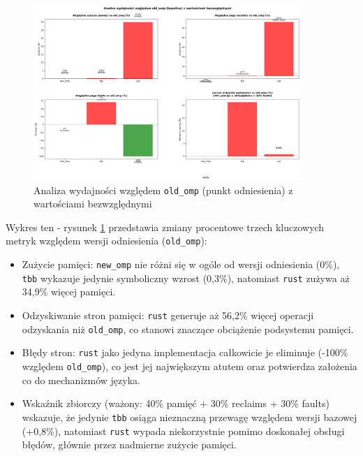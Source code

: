 \begin{figure}[!h]
    \centering
    \includegraphics[width=0.9\textwidth]{analiza/images/parallel/is/arm/chart_05_performance_ratios.png}
    \caption{Analiza wydajności względem \texttt{old\_omp} (punkt odniesienia) z wartościami bezwzględnymi}
    \label{is_analiza_wzgledem_old_omp}
\end{figure}
Wykres ten - rysunek \ref{is_analiza_wzgledem_old_omp} przedstawia zmiany procentowe trzech kluczowych metryk względem wersji odniesienia (\texttt{old\_omp}):
\begin{itemize}
    \item Zużycie pamięci: \texttt{new\_omp} nie różni się w ogóle od wersji odniesienia (0\%), \texttt{tbb} wykazuje jedynie symboliczny wzrost (0,3\%), natomiast \texttt{rust} zużywa aż 34,9\% więcej pamięci.
    \item Odzyskiwanie stron pamięci: \texttt{rust} generuje aż 56,2\% więcej operacji odzyskania niż \texttt{old\_omp}, co stanowi znaczące obciążenie podsystemu pamięci.
    \item Błędy stron: \texttt{rust} jako jedyna implementacja całkowicie je eliminuje (-100\% względem \texttt{old\_omp}), co jest jej największym atutem oraz potwierdza założenia co do mechanizmów języka.
    \item Wskaźnik zbiorczy (ważony: 40\% pamięć + 30\% reclaims + 30\% faults) wskazuje, że jedynie \texttt{tbb} osiąga nieznaczną przewagę względem wersji bazowej (+0,8\%), natomiast \texttt{rust} wypada niekorzystnie pomimo doskonałej obsługi błędów, głównie przez nadmierne zużycie pamięci.
\end{itemize}



